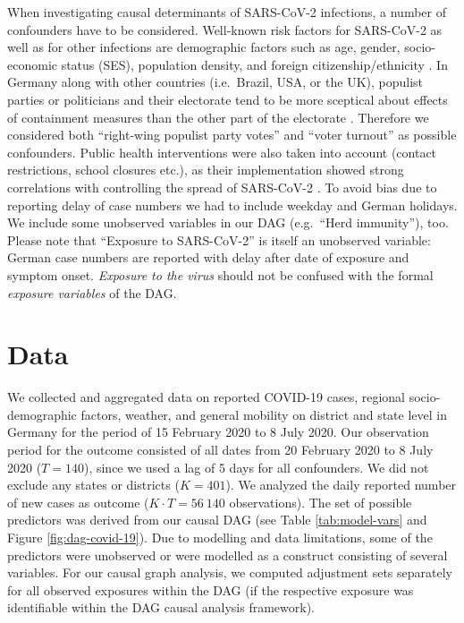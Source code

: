 \documentclass[]{elsarticle} %
\begin{document}
When investigating causal determinants of SARS-CoV-2 infections, a number of confounders have to be considered. Well-known risk factors for SARS-CoV-2 as well as for other infections are demographic factors such as age, gender, socio-economic status (SES), population density, and foreign citizenship/ethnicity \citep{de2020risk, Dragano2020.06.17.20133918, jhucovid19db2020}. In Germany along with other countries (i.e.~Brazil, USA, or the UK), populist parties or politicians and their electorate tend to be more sceptical about effects of containment measures than the other part of the electorate \citep{dohle_wingen_schreiber_2020, engle_staying_2020}. Therefore we considered both ``right-wing populist party votes'' and ``voter turnout'' as possible confounders. Public health interventions were also taken into account (contact restrictions, school closures etc.), as their implementation showed strong correlations with controlling the spread of SARS-CoV-2 \citep{cowling2020impact, juni_impact_2020, lai_effect_2020}. To avoid bias due to reporting delay of case numbers we had to include weekday and German holidays. We include some unobserved variables in our DAG (e.g.~``Herd immunity''), too. Please note that ``Exposure to SARS-CoV-2'' is itself an unobserved variable: German case numbers are reported with delay after date of exposure and symptom onset. \emph{Exposure to the virus} should not be confused with the formal \emph{exposure variables} of the DAG.

\hypertarget{data}{%
\section{Data}\label{data}}

We collected and aggregated data on reported COVID-19 cases, regional socio-demographic factors, weather, and general mobility on district and state level in Germany for the period of 15 February 2020 to 8 July 2020. Our observation period for the outcome consisted of all dates from 20 February 2020 to 8 July 2020 (\(T=140\)), since we used a lag of 5 days for all confounders. We did not exclude any states or districts (\(K=401\)). We analyzed the daily reported number of new cases as outcome (\(K\cdot T=56{\ }140\) observations). The set of possible predictors was derived from our causal DAG (see Table \ref{tab:model-vars} and Figure \ref{fig:dag-covid-19}). Due to modelling and data limitations, some of the predictors were unobserved or were modelled as a construct consisting of several variables. For our causal graph analysis, we computed adjustment sets separately for all observed exposures within the DAG (if the respective exposure was identifiable within the DAG causal analysis framework).
\end{document}

